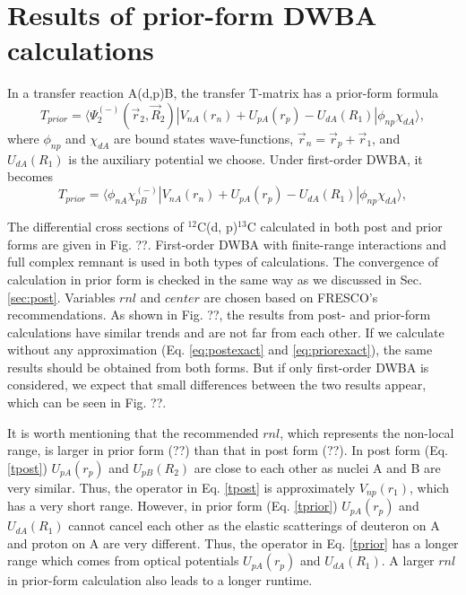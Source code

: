 \section{Results of prior-form DWBA calculations}
In a transfer reaction A(d,p)B, the transfer T-matrix has a prior-form formula \cite{thompson2009nuclear}
\begin{equation}\label{eq:priorexact}
T_{prior}=\langle\Psi_2^{(-)}(\vec{r}_2,\vec{R}_2)\left|V_{nA}(r_n)+U_{pA}(r_p)-U_{dA}(R_1)\right|\phi_{np}\chi_{dA}\rangle,
\end{equation}
where $\phi_{np}$ and $\chi_{dA}$ are bound states wave-functions, $\vec{r}_n=\vec{r}_p+\vec{r}_1$, 
and $U_{dA}(R_1)$ is the auxiliary potential we choose. 
Under first-order DWBA, it becomes
\begin{equation}\label{tprior}
T_{prior}=\langle\phi_{nA}\chi_{pB}^{(-)}\left|V_{nA}(r_n)+U_{pA}(r_p)-U_{dA}(R_1)\right|\phi_{np}\chi_{dA}\rangle,
\end{equation}
\par
The differential cross sections of $^{12}$C(d, p)$^{13}$C calculated in both post and prior forms are given in Fig. ??. 
First-order DWBA with finite-range interactions and full complex remnant is used in both types of calculations. 
The convergence of calculation in prior form is checked in the same way as we discussed in Sec. \ref{sec:post}. 
Variables $rnl$ and $center$ are chosen based on FRESCO's recommendations. 
As shown in Fig. ??, the results from post- and prior-form calculations have similar trends and are not far from each other. 
If we calculate without any approximation (Eq. \ref{eq:postexact} and \ref{eq:priorexact}), 
the same results should be obtained from both forms. 
But if only first-order DWBA is considered, we expect that small differences between the two results appear, 
which can be seen in Fig. ??. 
\par
It is worth mentioning that the recommended $rnl$, which represents the non-local range, is larger in prior form (??) than that in post form (??). 
In post form (Eq. \ref{tpost}) $U_{pA}(r_p)$ and $U_{pB}(R_2)$ are close to each other as nuclei A and B are very similar. 
Thus, the operator in Eq. \ref{tpost} is approximately $V_{np}(r_1)$, which has a very short range. 
However, in prior form (Eq. \ref{tprior}) $U_{pA}(r_p)$ and $U_{dA}(R_1)$ cannot cancel each other as the elastic scatterings of deuteron on A and proton on A are very different. 
Thus, the operator in Eq. \ref{tprior} has a longer range which comes from optical potentials $U_{pA}(r_p)$ and $U_{dA}(R_1)$. 
A larger $rnl$ in prior-form calculation also leads to a longer runtime. 